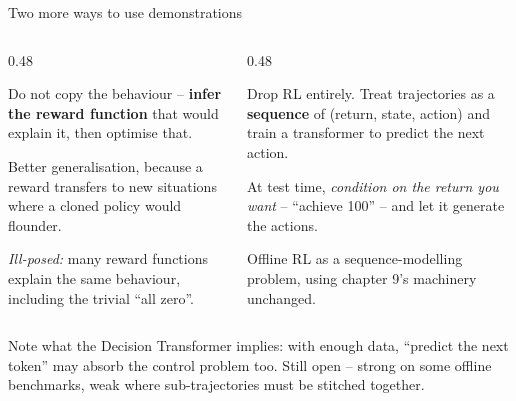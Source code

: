 \documentclass[aspectratio=169]{beamer}
\begin{document}
\begin{frame}{Two more ways to use demonstrations}
  \begin{columns}[T]
    \begin{column}{0.48\textwidth}
      \begin{tcolorbox}[colback=armorange!12, colframe=armorange, boxrule=0.6pt, arc=2pt,
                        title={\textbf{Inverse RL}}]
        \small
        Do not copy the behaviour -- \textbf{infer the reward function} that would explain it,
        then optimise that.

        \vskip 4pt
        Better generalisation, because a reward transfers to new situations where a cloned
        policy would flounder.

        \vskip 4pt
        \emph{Ill-posed:} many reward functions explain the same behaviour, including the
        trivial ``all zero''.
      \end{tcolorbox}
    \end{column}
    \begin{column}{0.48\textwidth}
      \begin{tcolorbox}[colback=violet1!12, colframe=violet1, boxrule=0.6pt, arc=2pt,
                        title={\textbf{Decision Transformer}}]
        \small
        Drop RL entirely. Treat trajectories as a \textbf{sequence} of
        (return, state, action) and train a transformer to predict the next action.

        \vskip 4pt
        At test time, \emph{condition on the return you want} -- ``achieve 100'' -- and let it
        generate the actions.

        \vskip 4pt
        Offline RL as a sequence-modelling problem, using chapter 9's machinery unchanged.
      \end{tcolorbox}
    \end{column}
  \end{columns}

  \vskip 6pt
  \begin{tcolorbox}[colback=lightbg, colframe=popblue, boxrule=0.6pt, arc=2pt]
    \footnotesize
    Note what the Decision Transformer implies: with enough data, ``predict the next token'' may
    absorb the control problem too. Still open -- strong on some offline benchmarks, weak where
    sub-trajectories must be stitched together.
  \end{tcolorbox}
\end{frame}

\end{document}
